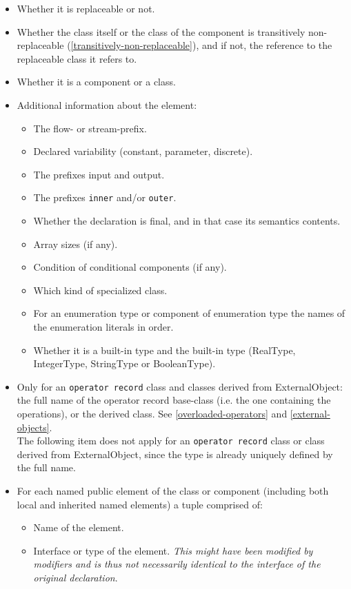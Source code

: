 \begin{itemize}
\item
  Whether it is replaceable or not.
\item
  Whether the class itself or the class of the component is transitively
  non-replaceable (\autoref{transitively-non-replaceable}), and if not, the reference to the
  replaceable class it refers to.
\item
  Whether it is a component or a class.
\item
  Additional information about the element:

  \begin{itemize}
  \item
    The flow- or stream-prefix.
  \item
    Declared variability (constant, parameter, discrete).
  \item
    The prefixes input and output.
  \item
    The prefixes \lstinline[basicstyle=\ttfamily]!inner! and/or \lstinline[basicstyle=\ttfamily]!outer!.
  \item
    Whether the declaration is final, and in that case its semantics
    contents.
  \item
    Array sizes (if any).
  \item
    Condition of conditional components (if any).
  \item
    Which kind of specialized class.
  \item
    For an enumeration type or component of enumeration type the names
    of the enumeration literals in order.
  \item
    Whether it is a built-in type and the built-in type (RealType,
    IntegerType, StringType or BooleanType).
  \end{itemize}
\item
  Only for an \lstinline[basicstyle=\ttfamily]!operator record! class and classes derived from
  ExternalObject: the full name of the operator record base-class (i.e.
  the one containing the operations), or the derived class. See
  \autoref{overloaded-operators} and \autoref{external-objects}.\\
  The following item does not apply for an \lstinline[basicstyle=\ttfamily]!operator record! class or
  class derived from ExternalObject, since the type is already uniquely
  defined by the full name.
\item
  For each named public element of the class or component (including
  both local and inherited named elements) a tuple comprised of:

  \begin{itemize}
  \item
    Name of the element.
  \item
    Interface or type of the element. \emph{This might have been
    modified by modifiers and is thus not necessarily identical to the
    interface of the original declaration}.
  \end{itemize}
\end{itemize}

